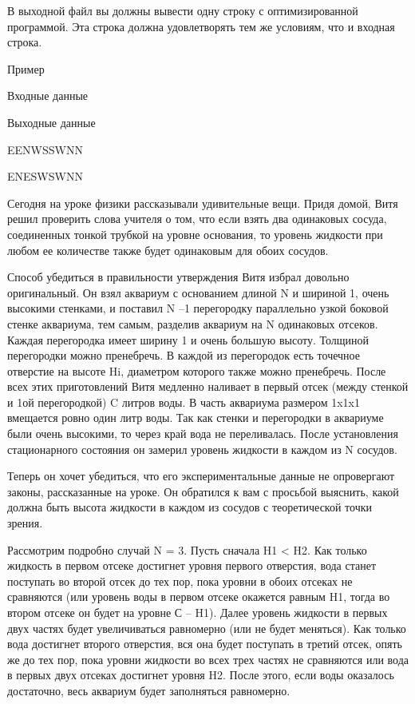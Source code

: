 \documentclass[]{article}
\begin{document}
В выходной файл вы должны вывести одну строку с оптимизированной программой. Эта строка должна удовлетворять тем же условиям, что и входная строка.

Пример

Входные данные
	

Выходные данные

EENWSSWNN
	

ENESWSWNN


Сегодня на уроке физики рассказывали удивительные вещи. Придя домой, Витя решил проверить слова учителя о том, что если взять два одинаковых сосуда, соединенных тонкой трубкой на уровне основания, то уровень жидкости при любом ее количестве также будет одинаковым для обоих сосудов.

Способ убедиться в правильности утверждения Витя избрал довольно оригинальный. Он взял аквариум с основанием длиной N и шириной 1, очень высокими стенками, и поставил N –1 перегородку параллельно узкой боковой стенке аквариума, тем самым, разделив аквариум на N одинаковых отсеков. Каждая перегородка имеет ширину 1 и очень большую высоту. Толщиной перегородки можно пренебречь. В каждой из перегородок есть точечное отверстие на высоте Hi, диаметром которого также можно пренебречь. После всех этих приготовлений Витя медленно наливает в первый отсек (между стенкой и 1ой перегородкой) C литров воды. В часть аквариума размером 1x1x1 вмещается ровно один литр воды. Так как стенки и перегородки в аквариуме были очень высокими, то через край вода не переливалась. После установления стационарного состояния он замерил уровень жидкости в каждом из N сосудов.

Теперь он хочет убедиться, что его экспериментальные данные не опровергают законы, рассказанные на уроке. Он обратился к вам с просьбой выяснить, какой должна быть высота жидкости в каждом из сосудов с теоретической точки зрения.

Рассмотрим подробно случай N = 3. Пусть сначала H1 < H2. Как только жидкость в первом отсеке достигнет уровня первого отверстия, вода станет поступать во второй отсек до тех пор, пока уровни в обоих отсеках не сравняются (или уровень воды в первом отсеке окажется равным H1, тогда во втором отсеке он будет на уровне С – H1). Далее уровень жидкости в первых двух частях будет увеличиваться равномерно (или не будет меняться). Как только вода достигнет второго отверстия, вся она будет поступать в третий отсек, опять же до тех пор, пока уровни жидкости во всех трех частях не сравняются или вода в первых двух отсеках достигнет уровня H2. После этого, если воды оказалось достаточно, весь аквариум будет заполняться равномерно.
\end{document}
